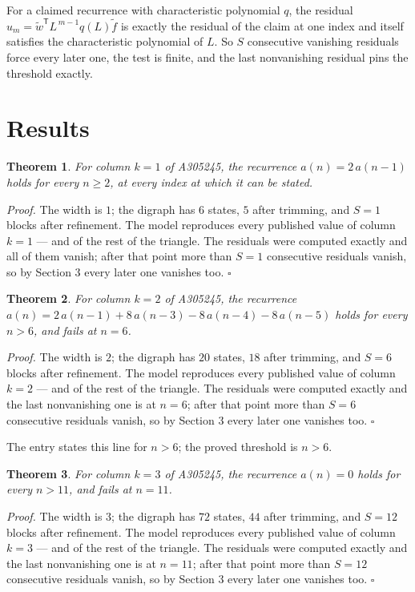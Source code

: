 \documentclass[11pt]{article}
\newtheorem{theorem}{Theorem}
\theoremstyle{definition}
\begin{document}
For a claimed recurrence with characteristic polynomial $q$, the residual $u_m = \tilde w^{\mathsf T}L^{\,m-1}q(L)\tilde f$ is exactly the residual of the claim at one index and itself satisfies the characteristic polynomial of $L$. So $S$ consecutive vanishing residuals force every later one, the test is finite, and the last nonvanishing residual pins the threshold exactly.

\section{Results}

\begin{theorem} For column $k = 1$ of A305245, the recurrence $a(n) = 2\,a(n-1)$ holds for every $n \ge 2$, at every index at which it can be stated.\end{theorem}

{\itshape Proof.} The width is $1$; the digraph has $6$ states, $5$ after trimming, and $S = 1$ blocks after refinement. The model reproduces every published value of column $k = 1$ --- and of the rest of the triangle. The residuals were computed exactly and all of them vanish; after that point more than $S = 1$ consecutive residuals vanish, so by Section 3 every later one vanishes too. $\square$

\begin{theorem} For column $k = 2$ of A305245, the recurrence $a(n) = 2\,a(n-1) + 8\,a(n-3) - 8\,a(n-4) - 8\,a(n-5)$ holds for every $n > 6$, and fails at $n = 6$.\end{theorem}

{\itshape Proof.} The width is $2$; the digraph has $20$ states, $18$ after trimming, and $S = 6$ blocks after refinement. The model reproduces every published value of column $k = 2$ --- and of the rest of the triangle. The residuals were computed exactly and the last nonvanishing one is at $n = 6$; after that point more than $S = 6$ consecutive residuals vanish, so by Section 3 every later one vanishes too. $\square$

The entry states this line for $n > 6$; the proved threshold is $n > 6$.

\begin{theorem} For column $k = 3$ of A305245, the recurrence $a(n) = 0$ holds for every $n > 11$, and fails at $n = 11$.\end{theorem}

{\itshape Proof.} The width is $3$; the digraph has $72$ states, $44$ after trimming, and $S = 12$ blocks after refinement. The model reproduces every published value of column $k = 3$ --- and of the rest of the triangle. The residuals were computed exactly and the last nonvanishing one is at $n = 11$; after that point more than $S = 12$ consecutive residuals vanish, so by Section 3 every later one vanishes too. $\square$
\end{document}
